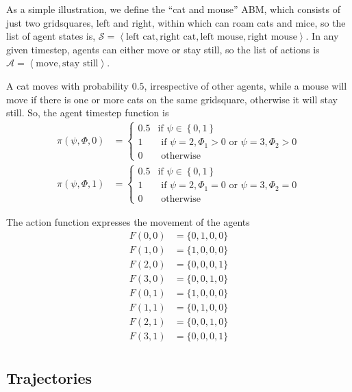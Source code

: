 \documentclass{article}
\begin{document}
As a simple illustration, we define the ``cat and mouse'' ABM, which consists of just two gridsquares, left and right, within which can roam cats and mice, so the list of agent states is, $\mathcal{S} = \left<\textrm{left cat}, \textrm{right cat}, \textrm{left mouse}, \textrm{right mouse} \right>$. In any given timestep, agents can either move or stay still, so the list of actions is $\mathcal{A} = \left<\textrm{move}, \textrm{stay still}\right>$.

A cat moves with probability $0.5$, irrespective of other agents, while a mouse will move if there is one or more cats on the same gridsquare, otherwise it will stay still. So, the agent timestep function is
\begin{equation}
\begin{aligned}
\pi(\psi, \Phi, 0) &=
\begin{cases}
0.5 & \text{if } \psi \in \left\{0,1\right\}\\
1 & \text{ if } \psi = 2, \Phi_1 > 0 \text{ or } \psi=3, \Phi_2 > 0\\
0 & \text{ otherwise}
\end{cases}\\
\pi(\psi, \Phi, 1) &=
\begin{cases}
0.5 & \text{if } \psi \in \left\{0, 1\right\}\\
1 & \text{ if } \psi = 2, \Phi_1 = 0 \text{ or } \psi=3, \Phi_2 = 0\\
0 & \text{ otherwise}
\end{cases}
\end{aligned}
\end{equation}

The action function expresses the movement of the agents
\begin{equation}
\begin{aligned}
F(0, 0) &= \{0,1,0,0\}\\
F(1, 0) &= \{1,0,0,0\}\\
F(2, 0) &= \{0,0,0,1\}\\
F(3, 0) &= \{0,0,1,0\}\\
F(0, 1) &= \{1,0,0,0\}\\
F(1, 1) &= \{0,1,0,0\}\\
F(2, 1) &= \{0,0,1,0\}\\
F(3, 1) &= \{0,0,0,1\}\\
\end{aligned}
\end{equation}

\subsection{Trajectories}
\end{document}

